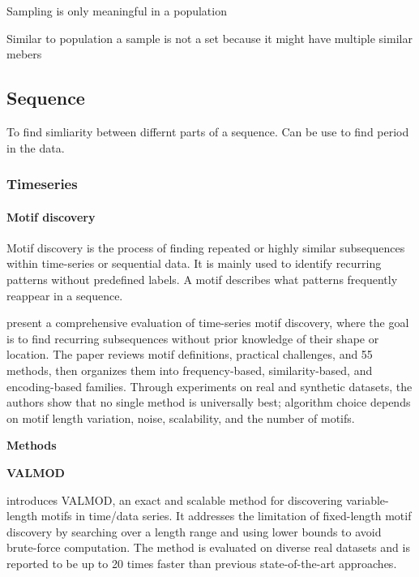 \documentclass{book}
\providecommand{\ProjectDeepHeading}[2]{%
    \par\medskip\noindent\textbf{#2}\par\smallskip
}
\begin{document}

Sampling is only meaningful in a population


Similar to population a sample is not a set because it might have multiple similar mebers

\subsection{Sequence}


To find simliarity between differnt parts of a sequence. Can be use to find period in the data.

\subsubsection{Timeseries}

\paragraph{Motif discovery}


Motif discovery is the process of finding repeated or highly similar subsequences within time-series or sequential data. It is mainly used to identify recurring patterns without predefined labels. A motif describes what patterns frequently reappear in a sequence.

   \cite{guerrini-2025-time-series-motif-discovery-a-comprehensive-evaluation} present a comprehensive evaluation of time-series motif discovery, where the goal is to find recurring subsequences without prior knowledge of their shape or location. The paper reviews motif definitions, practical challenges, and 55 methods, then organizes them into frequency-based, similarity-based, and encoding-based families. Through experiments on real and synthetic datasets, the authors show that no single method is universally best; algorithm choice depends on motif length variation, noise, scalability, and the number of motifs.




   \ProjectDeepHeading{2}{Methods}
      \ProjectDeepHeading{3}{VALMOD}
         \cite{linardi-2018-matrix-profile-x-valmod-scalable-discovery-of-variable-length-motifs-in-data-series} introduces VALMOD, an exact and scalable method for discovering variable-length motifs in time/data series. It addresses the limitation of fixed-length motif discovery by searching over a length range and using lower bounds to avoid brute-force computation. The method is evaluated on diverse real datasets and is reported to be up to 20 times faster than previous state-of-the-art approaches.
\end{document}

